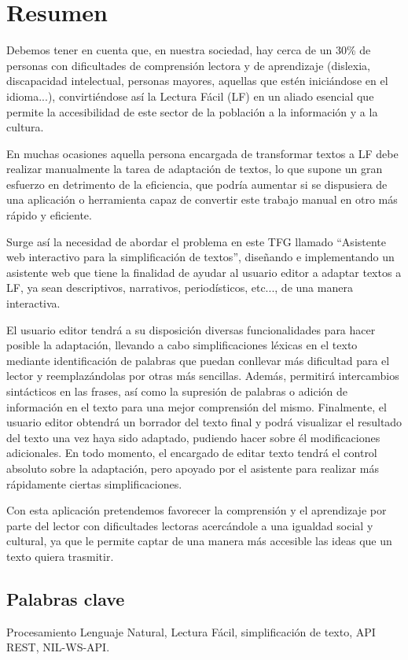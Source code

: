 \chapter*{Resumen}

Debemos tener en cuenta que, en nuestra sociedad, hay cerca de un 30\% de personas con dificultades de comprensión lectora y de aprendizaje (dislexia, discapacidad intelectual, personas mayores, aquellas que estén iniciándose en el idioma...), convirtiéndose así la Lectura Fácil (LF) en un aliado esencial que permite la accesibilidad de este sector de la población a la información y a la cultura. 

 \setlength{\parskip}{10pt}

En muchas ocasiones aquella persona encargada de transformar textos a LF debe realizar manualmente la tarea de adaptación de textos, lo que supone un gran esfuerzo en detrimento de la eficiencia, que podría aumentar si se dispusiera de una aplicación o herramienta capaz de convertir este trabajo manual en otro más rápido y eficiente.

 \setlength{\parskip}{10pt}

Surge así la necesidad de abordar el problema en este TFG llamado ``Asistente web interactivo para la simplificación de textos'', diseñando e implementando un asistente web que tiene la finalidad de ayudar al usuario editor a adaptar textos a LF, ya sean descriptivos, narrativos, periodísticos, etc..., de una manera interactiva. 

 \setlength{\parskip}{10pt}

El usuario editor tendrá a su disposición diversas funcionalidades para hacer posible la adaptación, llevando a cabo simplificaciones léxicas en el texto mediante identificación de palabras que puedan conllevar más dificultad para el lector y reemplazándolas por otras más sencillas. Además, permitirá intercambios sintácticos en las frases, así como la supresión de palabras o adición de información en el texto para una mejor comprensión del mismo. Finalmente, el usuario editor obtendrá un borrador del texto final y podrá visualizar el resultado del texto una vez haya sido adaptado, pudiendo hacer sobre él modificaciones adicionales. En todo momento, el encargado de editar texto tendrá el control absoluto sobre la adaptación, pero apoyado por el asistente para realizar más rápidamente ciertas simplificaciones.

 \setlength{\parskip}{10pt}

Con esta aplicación pretendemos favorecer la comprensión y el aprendizaje por parte del lector con dificultades lectoras acercándole a una igualdad social y cultural, ya que le permite captar de una manera más accesible las ideas que un texto quiera trasmitir.



\section*{Palabras clave}
   
\noindent Procesamiento Lenguaje Natural, Lectura Fácil, simplificación de texto, API REST, NIL-WS-API.

   



